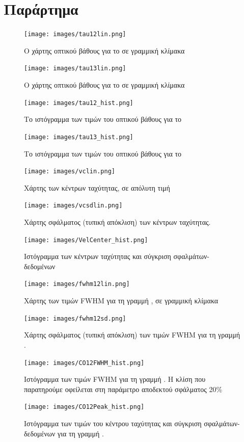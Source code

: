 \documentclass[a4paper,12pt]{memoir}
\begin{document}
\chapter*{Παράρτημα}
\begin{figure}[h]
	\centering
	\texttt{[image: images/tau12lin.png]}
	\caption{Ο χάρτης οπτικού βάθους για το  σε γραμμική κλίμακα}
	\centering
	\texttt{[image: images/tau13lin.png]}
	\caption{Ο χάρτης οπτικού βάθους για το  σε γραμμική κλίμακα}
\end{figure}

\begin{figure}[h]
	\centering
	\texttt{[image: images/tau12\_hist.png]}
	\caption{Το ιστόγραμμα των τιμών του οπτικού βάθους για το }
	\centering
	\texttt{[image: images/tau13\_hist.png]}
	\caption{Το ιστόγραμμα των τιμών του οπτικού βάθους για το }
\end{figure}

\begin{figure}[h]
	\centering
	\texttt{[image: images/vclin.png]}
	\caption{Χάρτης των κέντρων ταχύτητας, σε απόλυτη τιμή}
	
	\centering
	\texttt{[image: images/vcsdlin.png]}
	\caption{Χάρτης σφάλματος (τυπική απόκλιση) των κέντρων ταχύτητας.}
\end{figure}

\begin{figure}[h]
	\centering
	\texttt{[image: images/VelCenter\_hist.png]}
	\caption{Ιστόγραμμα των κέντρων ταχύτητας και σύγκριση σφαλμάτων-δεδομένων}
\end{figure}


\begin{figure}[h]
	\centering
	\texttt{[image: images/fwhm12lin.png]}
	\caption{Χάρτης των τιμών FWHM για τη γραμμή , σε γραμμική κλίμακα}
	
	\centering
	\texttt{[image: images/fwhm12sd.png]}
	\caption{Χάρτης σφάλματος (τυπική απόκλιση) των τιμών FWHM για τη γραμμή .}
\end{figure}

\begin{figure}[h]
	\centering
	\texttt{[image: images/CO12FWHM\_hist.png]}
	\caption{Ιστόγραμμα των τιμών FWHM για τη γραμμή . Η κλίση που παρατηρούμε οφείλεται στη παράμετρο αποδεκτού σφάλματος 20\%}
	
	\centering
	\texttt{[image: images/CO12Peak\_hist.png]}
	\caption{Ιστόγραμμα των τιμών του κέντρου ταχύτητας και σύγκριση σφαλμάτων-δεδομένων για τη γραμμή .}
\end{figure}
\end{document}

